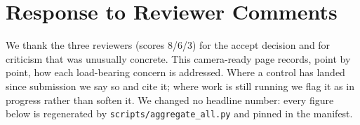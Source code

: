 %
%
%

\section*{Response to Reviewer Comments}
\label{sec:response}

We thank the three reviewers (scores 8/6/3) for the accept decision and
for criticism that was unusually concrete. This camera-ready page records,
point by point, how each load-bearing concern is addressed. Where a control
has landed since submission we say so and cite it; where work is still
running we flag it as in progress rather than soften it. We changed no
headline number: every figure below is regenerated by
\texttt{scripts/aggregate\_all.py} and pinned in the manifest.

